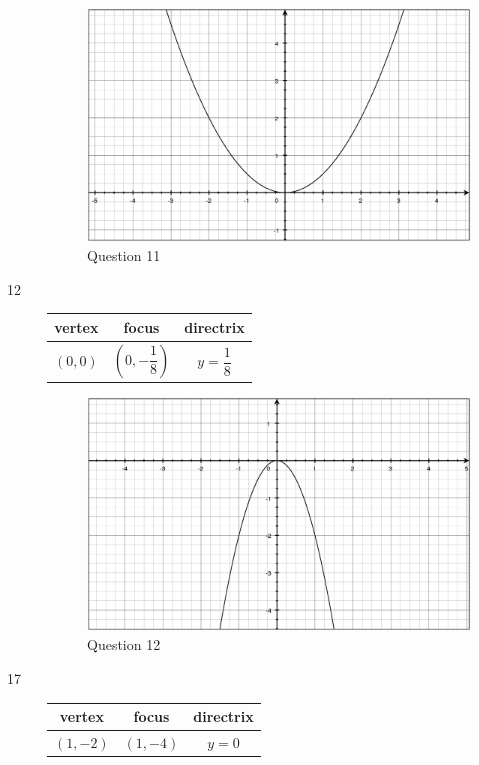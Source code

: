 \documentclass[fleqn,addpoints]{exam}
\begin{document}
\begin{description}
\begin{figure}[H]
  \centering
  \includegraphics[scale=.3]{question11.eps}
  \caption*{Question 11}
\end{figure}

\item[12]
\begin{tabular}{ccc}
\toprule
vertex & focus & directrix \\
\midrule
  $(0, 0)$ & $\left(0, -\dfrac{1}{8} \right)$ & $y = \dfrac{1}{8}$ \\
\bottomrule
\end{tabular}

\begin{figure}[H]
  \centering
  \includegraphics[scale=.3]{question12.eps}
  \caption*{Question 12}
\end{figure}

\item[17]
\begin{tabular}{ccc}
\toprule
vertex & focus & directrix \\
\midrule
  $(1, -2)$ & $\left(1, -4 \right)$ & $y = 0$ \\
\bottomrule
\end{tabular}


\end{description}
\end{document}
